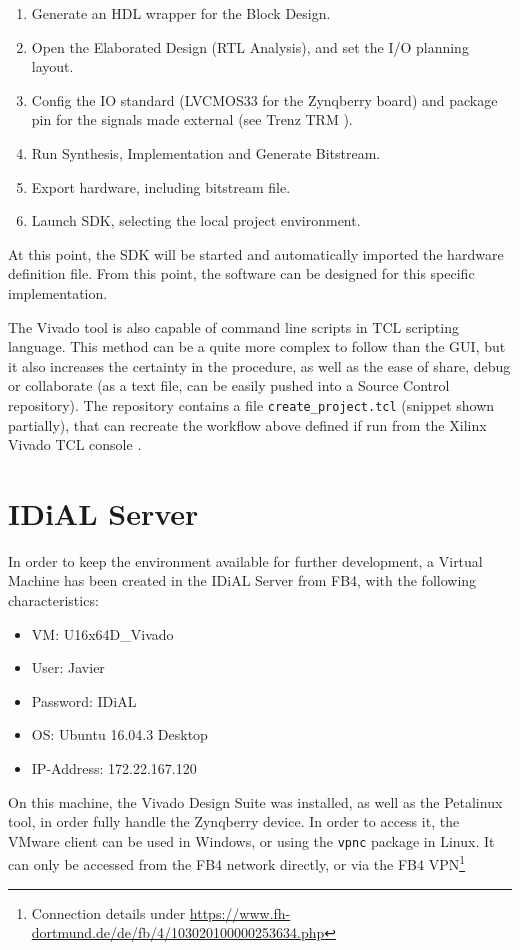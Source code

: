 \begin{enumerate}
	\item Generate an HDL wrapper for the Block Design.
	\item Open the Elaborated Design (RTL Analysis), and set the I/O planning layout.
	\item Config the IO standard (LVCMOS33 for the Zynqberry board) and package pin for the signals made external (see Trenz TRM \cite{zynq-trm}).
	\item Run Synthesis, Implementation and Generate Bitstream.
	\item Export hardware, including bitstream file.
	\item Launch SDK, selecting the local project environment.
\end{enumerate}

At this point, the SDK will be started and automatically imported the hardware definition file. From this point, the software can be designed for this specific implementation.

The Vivado tool is also capable of command line scripts in TCL scripting language. This method can be a quite more complex to follow than the GUI, but it also increases the certainty in the procedure, as well as the ease of share, debug or collaborate (as a text file, can be easily pushed into a Source Control repository). The repository contains a file \texttt{create\_project.tcl} (snippet shown partially), that can recreate the workflow above defined if run from the Xilinx Vivado TCL console \cite{UG835}.



\section{IDiAL Server}

In order to keep the environment available for further development, a Virtual Machine has been created in the IDiAL Server from FB4, with the following characteristics:

\begin{itemize}
	\item VM: U16x64D\_Vivado
	\item User: Javier
	\item Password: IDiAL
	\item OS: Ubuntu 16.04.3 Desktop
	\item IP-Address: 172.22.167.120
\end{itemize}

On this machine, the Vivado Design Suite was installed, as well as the Petalinux tool, in order fully handle the Zynqberry device. In order to access it, the VMware client can be used in Windows, or using the \texttt{vpnc} package in Linux. It can only be accessed from the FB4 network directly, or via the FB4 VPN\footnote{Connection details under \underline{https://www.fh-dortmund.de/de/fb/4/103020100000253634.php}}
